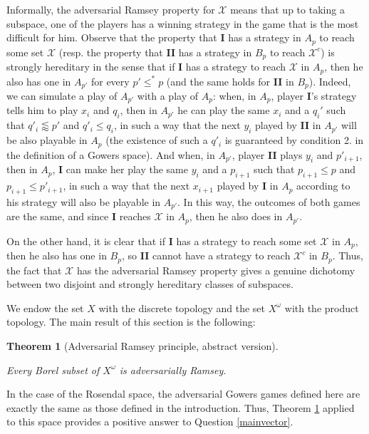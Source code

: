 \documentclass[a4paper,11pt]{article}
\newtheorem{thm}{Theorem}[section]
\theoremstyle{definition}
\numberwithin{equation}{section}
\newcommand{\X}{\mathcal{X}}
\newcommand{\I}{\textbf{I}}
\newcommand{\II}{\textbf{II}}
\begin{document}
Informally, the adversarial Ramsey property for $\X$ means that up to taking a subspace, one of the players has a winning strategy in the game that is the most difficult for him. Observe that the property that \I{} has a strategy in $A_p$ to reach some set $\X$ (resp. the property that \II{} has a strategy in $B_p$ to reach $\X^c$) is strongly hereditary in the sense that if \I{} has a strategy to reach $\X$ in $A_p$, then he also has one in $A_{p'}$ for every $p' \leqslant^* p$ (and the same holds for \II{} in $B_p$). Indeed, we can simulate a play of $A_{p'}$ with a play of $A_p$: when, in $A_p$, player \I{}'s strategy tells him to play $x_i$ and $q_i$, then in $A_{p'}$ he can play the same $x_i$ and a $q_i'$ such that $q'_i \lessapprox p'$ and $q'_i \leqslant q_i$, in such a way that the next $y_i$ played by \II{} in $A_{p'}$ will be also playable in $A_p$ (the existence of such a $q'_i$ is guaranteed by condition 2. in the definition of a Gowers space). And when, in $A_{p'}$, player \II{} plays $y_i$ and $p'_{i + 1}$, then in $A_p$, \I{} can make her play the same $y_i$ and a $p_{i + 1}$ such that $p_{i + 1} \leqslant p$ and $p_{i + 1} \leqslant p'_{i + 1}$, in such a way that the next $x_{i + 1}$ played by \I{} in $A_p$ according to his strategy will also be playable in $A_{p'}$. In this way, the outcomes of both games are the same, and since \I{} reaches $\X$ in $A_p$, then he also does in $A_{p'}$.

\smallskip

On the other hand, it is clear that if $\I{}$ has a strategy to reach some set $\X$ in $A_p$, then he also has one in $B_p$, so \II{} cannot have a strategy to reach $\X^c$ in $B_p$. Thus, the fact that $\X$ has the adversarial Ramsey property gives a genuine dichotomy between two disjoint and strongly hereditary classes of subspaces.

\smallskip

We endow the set $X$ with the discrete topology and the set $X^\omega$ with the product topology. The main result of this section is the following:

\begin{thm}[Adversarial Ramsey principle, abstract version]\label{main}

Every Borel subset of $X^\omega$ is adversarially Ramsey.

\end{thm}

In the case of the Rosendal space, the adversarial Gowers games defined here are exactly the same as those defined in the introduction. Thus, Theorem \ref{main} applied to this space provides a positive answer to Question \ref{mainvector}.
\end{document}
